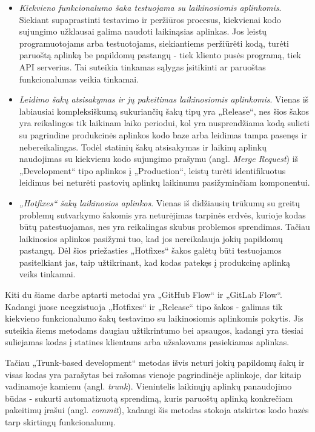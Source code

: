 \documentclass{VUMIFPSkursinis}
\begin{document}
\begin{itemize}
  \item \textit{Kiekvieno funkcionalumo šaka testuojama su laikinosiomis aplinkomis}. Siekiant supaprastinti testavimo ir peržiūros procesus, kiekvienai kodo sujungimo užklausai galima naudoti laikinąsias aplinkas. Jos leistų programuotojams arba testuotojams, siekiantiems peržiūrėti kodą, turėti paruoštą aplinką be papildomų pastangų - tiek kliento pusės programą, tiek API serverius. Tai suteikia tinkamas sąlygas įsitikinti ar paruoštas funkcionalumas veikia tinkamai.

  \item \textit{Leidimo šakų atsisakymas ir jų pakeitimas laikinosiomis aplinkomis}. Vienas iš labiausiai kompleksiškumą sukuriančių šakų tipų yra „Release“, nes šios šakos yra reikalingos tik laikinam laiko periodui, kol yra nusprendžiama kodą sulieti su pagrindine produkcinės aplinkos kodo baze arba leidimas tampa pasenęs ir nebereikalingas. Todėl statinių šakų atsisakymas ir laikinų aplinkų naudojimas su kiekvienu kodo sujungimo prašymu (angl. \textit{Merge Request}) iš „Development“ tipo aplinkos į „Production“, leistų turėti identifikuotus leidimus bei neturėti pastovių aplinkų laikinumu pasižyminčiam komponentui.
  
  \item \textit{„Hotfixes“ šakų laikinosios aplinkos}. Vienas iš didžiausių trūkumų su greitų problemų sutvarkymo šakomis yra neturėjimas tarpinės erdvės, kurioje kodas būtų patestuojamas, nes yra reikalingas skubus problemos sprendimas. Tačiau laikinosios aplinkos pasižymi tuo, kad jos nereikalauja jokių papildomų pastangų. Dėl šios priežasties „Hotfixes“ šakos galėtų būti testuojamos pasitelkiant jas, taip užtikrinant, kad kodas patekęs į produkcinę aplinką veiks tinkamai.

\end{itemize}

Kiti du šiame darbe aptarti metodai yra „GitHub Flow“ ir „GitLab Flow“. Kadangi juose neegzistuoja „Hotfixes“ ir „Release“ tipo šakos - galimas tik kiekvieno funkcionalumo šakų testavimo su laikinosiomis aplinkomis pokytis. Jis suteikia šiems metodams daugiau užtikrintumo bei apsaugos, kadangi yra tiesiai suliejamas kodas į statines klientams arba užsakovams pasiekiamas aplinkas.

Tačiau „Trunk-based development“ metodas išvis neturi jokių papildomų šakų ir visas kodas yra parašytas bei rašomas vienoje pagrindinėje aplinkoje, dar kitaip vadinamoje kamienu (angl. \textit{trunk}). Vienintelis laikinųjų aplinkų panaudojimo būdas - sukurti automatizuotą sprendimą, kuris paruoštų aplinką konkrečiam pakeitimų įrašui (angl. \textit{commit}), kadangi šis metodas stokoja atskirtos kodo bazės tarp skirtingų funkcionalumų.
\end{document}
